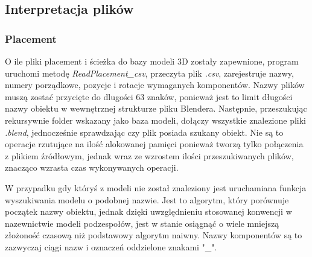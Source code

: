 \documentclass{xmgr}
\begin{document}
\subsection{Interpretacja plików}
\subsubsection{Placement}
O ile pliki placement i ścieżka do bazy modeli 3D zostały zapewnione, program uruchomi metodę \emph{ReadPlacement\_csv}, przeczyta plik \emph{.csv}, zarejestruje nazwy, numery porządkowe, pozycje i rotacje wymaganych komponentów. Nazwy plików muszą zostać przycięte do dlugości 63 znaków, ponieważ jest to limit długości nazwy obiektu w wewnętrznej strukturze pliku Blendera. Następnie, przeszukując rekursywnie folder wskazany jako baza modeli, dołączy wszystkie znalezione pliki \emph{.blend}, jednocześnie sprawdzając czy plik posiada szukany obiekt. Nie są to operacje rzutujące na ilość alokowanej pamięci ponieważ tworzą tylko połączenia z plikiem źródłowym, jednak wraz ze wzrostem ilości przeszukiwanych plików, znacząco wzrasta czas wykonywanych operacji.

W przypadku gdy któryś z modeli nie został znaleziony jest uruchamiana funkcja wyszukiwania modelu o podobnej nazwie. Jest to algorytm, który porównuje początek nazwy obiektu, jednak dzięki uwzględnieniu stosowanej konwencji w nazewnictwie modeli podzespołów, jest w stanie osiągnąć o wiele mniejszą złożoność czasową niż podstawowy algorytm naiwny. Nazwy komponentów są to zazwyczaj ciągi nazw i oznaczeń oddzielone znakami "\_".
\end{document}
